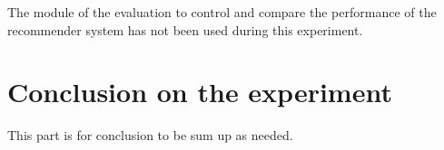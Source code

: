 \documentclass[11pt]{article}
\begin{document}
The module of the evaluation to control and compare the performance of the recommender
system has not been used during this experiment.
\hfill\break
\hfill\break



\section{Conclusion on the experiment}\label{sec:conclution}
This part is for conclusion to be sum up as needed.
\hfill\break
\hfill\break

\end{document}
